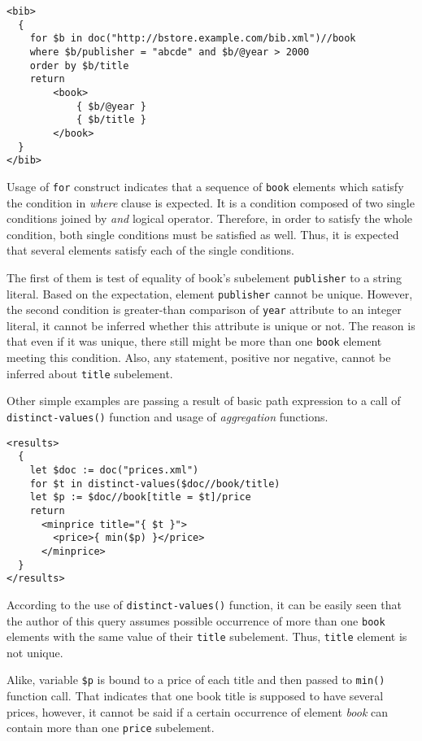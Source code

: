 \begin{verbatim}
<bib>
  {
    for $b in doc("http://bstore.example.com/bib.xml")//book
    where $b/publisher = "abcde" and $b/@year > 2000
    order by $b/title
    return
        <book>
            { $b/@year }
            { $b/title }
        </book>
  }
</bib>
\end{verbatim}

Usage of \texttt{for} construct indicates that a sequence of \texttt{book} elements which satisfy the condition in \emph{where} clause is expected. It is a condition composed of two single conditions joined by \emph{and} logical operator. Therefore, in order to satisfy the whole condition, both single conditions must be satisfied as well. Thus, it is expected that several elements satisfy each of the single conditions.

The first of them is test of equality of book's subelement \texttt{publisher} to a string literal. Based on the expectation, element \texttt{publisher} cannot be unique. However, the second condition is greater-than comparison of \texttt{year} attribute to an integer literal, it cannot be inferred whether this attribute is unique or not. The reason is that even if it was unique, there still might be more than one \texttt{book} element meeting this condition. Also, any statement, positive nor negative, cannot be inferred about \texttt{title} subelement.

Other simple examples are passing a result of basic path expression to a call of \texttt{distinct-values()} function and usage of \emph{aggregation} functions.

\begin{verbatim}
<results>
  {
    let $doc := doc("prices.xml")
    for $t in distinct-values($doc//book/title)
    let $p := $doc//book[title = $t]/price
    return
      <minprice title="{ $t }">
        <price>{ min($p) }</price>
      </minprice>
  }
</results>
\end{verbatim}

According to the use of \texttt{distinct-values()} function, it can be easily seen that the author of this query assumes possible occurrence of more than one \texttt{book} elements with the same value of their \texttt{title} subelement. Thus, \texttt{title} element is not unique.

Alike, variable \texttt{\$p} is bound to a price of each title and then passed to \texttt{min()} function call. That indicates that one book title is supposed to have several prices, however, it cannot be said if a certain occurrence of element \emph{book} can contain more than one \texttt{price} subelement.

